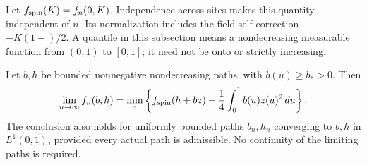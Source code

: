Let $f_{\rm spin}(K)=f_n(0,K)$. Independence across sites makes this
quantity independent of $n$. Its normalization includes the field
self-correction $-K(1-)/2$. A quantile in this subsection means a
nondecreasing measurable function from $(0,1)$ to $[0,1]$; it need
not be onto or strictly increasing.

\begin{lemma}
\label{prof:macro-variational}
Let $b,h$ be bounded nonnegative nondecreasing paths, with
$b(u)\ge b_*>0$. Then
\[
 \lim_{n\to\infty} f_n(b,h)
 =\min_z\left\{f_{\rm spin}(h+bz)
                         +\frac14\int_0^1 b(u)z(u)^2\,du\right\}.
\]
The conclusion also holds for uniformly bounded paths $b_n,h_n$
converging to $b,h$ in $L^1(0,1)$, provided every actual path is
admissible. No continuity of the limiting paths is required.
\end{lemma}

